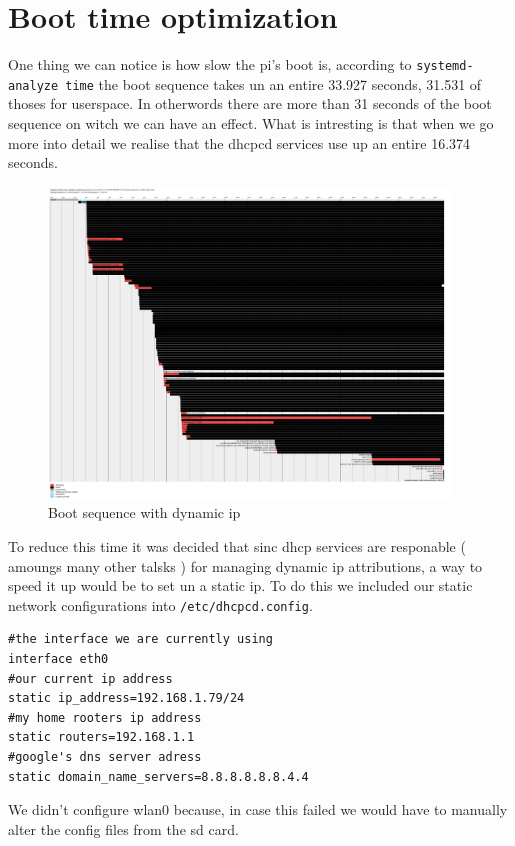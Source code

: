 \documentclass[a4paper,oneside,onecolumn]{article}
\newcommand{\code}[1]{\colorbox{codegray}{\texttt{#1}}}
\begin{document}
\section{Boot time optimization}
One thing we can notice is how slow the pi's boot is, according to \code{systemd-analyze time} the boot sequence takes un an entire 33.927 seconds, 31.531 of thoses for userspace. In otherwords there are more than 31 seconds of the boot sequence on witch we can have an effect. What is intresting is that when we go more into detail we realise that the dhcpcd services use up an entire 16.374 seconds.
\begin{figure}[htbp]
	\centering
	\includegraphics[width=0.95\textwidth]{resources/bootdyn.png}
	\caption{Boot sequence with dynamic ip}
	\label{fig:label}
\end{figure}
To reduce this time it was decided that sinc dhcp services are responable ( amoungs many other talsks ) for managing dynamic ip attributions, a way to speed it up would be to set un a static ip.\newline
To do this we included our static network configurations into \code{/etc/dhcpcd.config}.
\begin{lstlisting}
#the interface we are currently using
interface eth0
#our current ip address
static ip_address=192.168.1.79/24
#my home rooters ip address
static routers=192.168.1.1
#google's dns server adress
static domain_name_servers=8.8.8.8.8.8.4.4
\end{lstlisting}
We didn't configure wlan0 because, in case this failed we would have to manually alter the config files from the sd card.\newline
\end{document}
